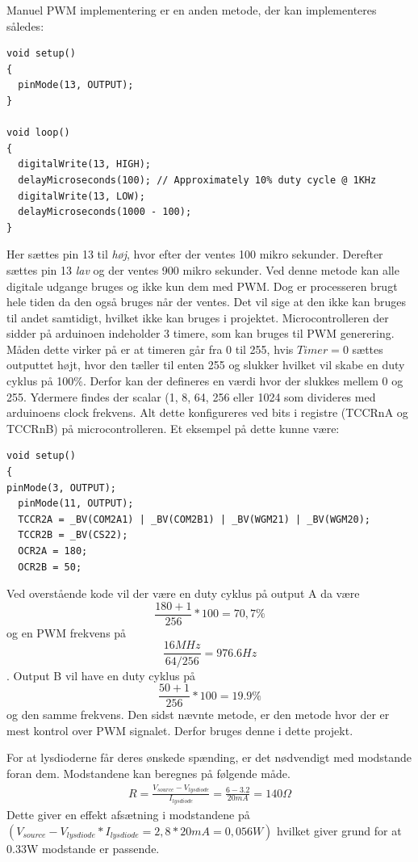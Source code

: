 Manuel PWM implementering er en anden metode, der kan implementeres således:

\begin{lstlisting}
void setup()
{
  pinMode(13, OUTPUT);
}

void loop()
{
  digitalWrite(13, HIGH);
  delayMicroseconds(100); // Approximately 10% duty cycle @ 1KHz
  digitalWrite(13, LOW);
  delayMicroseconds(1000 - 100);
}
\end{lstlisting}

Her sættes pin 13 til \textit{høj}, hvor efter der ventes 100 mikro sekunder. Derefter sættes pin 13 \textit{lav} og der ventes 900 mikro sekunder. Ved denne metode kan alle digitale udgange bruges og ikke kun dem med PWM. Dog er processeren brugt hele tiden da den også bruges når der ventes. Det vil sige at den ikke kan bruges til andet samtidigt, hvilket ikke kan bruges i projektet.
Microcontrolleren der sidder på arduinoen indeholder 3 timere, som kan bruges til PWM generering.  Måden dette virker på er at timeren går fra 0 til 255, hvis $Timer=0$ sættes outputtet højt, hvor den tæller til enten 255 og slukker hvilket vil skabe en duty cyklus på 100\%. Derfor kan der defineres en værdi hvor der slukkes mellem 0 og 255. Ydermere findes der scalar (1, 8, 64, 256 eller 1024 som divideres med arduinoens clock frekvens. Alt dette konfigureres ved bits i registre (TCCRnA og TCCRnB) på microcontrolleren. Et eksempel på dette kunne være: 

\begin{lstlisting}
void setup()
{
pinMode(3, OUTPUT);
  pinMode(11, OUTPUT);
  TCCR2A = _BV(COM2A1) | _BV(COM2B1) | _BV(WGM21) | _BV(WGM20);
  TCCR2B = _BV(CS22);
  OCR2A = 180;
  OCR2B = 50;
\end{lstlisting}

Ved overstående kode vil der være en duty cyklus på output A da være $$\frac{180+1}{256}*100=70,7\%$$ og en PWM frekvens på     
  $$\frac{16MHz}{64/256}=976.6Hz$$. Output B vil have en duty cyklus på $$\frac{50+1}{256}*100=19.9 \%$$ og den samme frekvens. Den sidst nævnte metode, er den metode hvor der er mest kontrol over PWM signalet. Derfor bruges denne i dette projekt.
  
For at lysdioderne får deres ønskede spænding, er det nødvendigt med modstande foran dem. Modstandene kan beregnes på følgende måde. 
\begin{align}
R=\frac{V_{source}-V_{lysdiode}}{I_{lysdiode}}=\frac{6-3.2}{20mA}=140\Omega
\label{eq:modstandLEDmotor}
\end{align} 
Dette giver en effekt afsætning i modstandene på $(V_{source}-V_{lysdiode}*I_{lysdiode}=2,8*20mA=0,056W)$ hvilket giver grund for at 0.33W modstande er passende.


